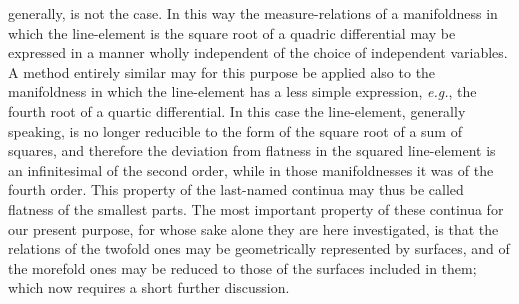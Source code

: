 \documentclass[a4paper,12pt]{article}
\begin{document}
generally, is not the case.  In this way the measure-relations of
a manifoldness in which the line-element is the square root of a
quadric differential may be expressed in a manner wholly
independent of the choice of independent variables.  A method
entirely similar may for this purpose be applied also to the
manifoldness in which the line-element has a less simple
expression, \emph{e.g.}, the fourth root of a quartic
differential.  In this case the line-element, generally speaking,
is no longer reducible to the form of the square root of a sum of
squares, and therefore the deviation from flatness in the squared
line-element is an infinitesimal of the second order, while in
those manifoldnesses it was of the fourth order.  This property
of the last-named continua may thus be called flatness of the
smallest parts.  The most important property of these continua
for our present purpose, for whose sake alone they are here
investigated, is that the relations of the twofold ones may be
geometrically represented by surfaces, and of the morefold ones
may be reduced to those of the surfaces included in them; which
now requires a short further discussion.

\bigbreak
\end{document}
